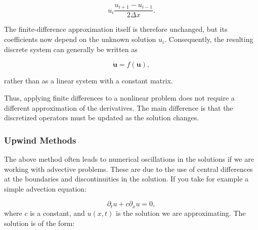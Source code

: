 \begin{equation}
u_i\frac{u_{i+1}-u_{i-1}}{2\Delta x}.
\end{equation}

The finite-difference approximation itself is therefore unchanged, but its coefficients now depend on the unknown solution $u_i$. Consequently, the resulting discrete system can generally be written as

\begin{equation}
\dot{\mathbf{u}} = f(\mathbf{u}),
\end{equation}

rather than as a linear system with a constant matrix.

Thus, applying finite differences to a nonlinear problem does not require a different approximation of the derivatives. The main difference is that the discretized operators must be updated as the solution changes.


\subsubsection{Upwind Methods}

The above method often leads to numerical oscillations in the solutions if we are working with advective problems. These are due to the use of central differences at the boundaries and discontinuities in the solution. If you take for example a simple advection equation:

\begin{equation*}
    \partial_t u + c \partial_x u = 0,
\end{equation*}
where $c$ is a constant, and $u(x,t)$ is the solution we are approximating. The solution is of the form:

